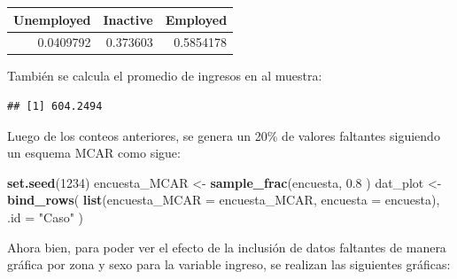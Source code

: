 \documentclass[
  spanish,
  12pt,
]{book}
\newenvironment{Shaded}{\begin{snugshade}}{\end{snugshade}}
\newcommand{\AttributeTok}[1]{\textcolor[rgb]{0.13,0.29,0.53}{#1}}
\newcommand{\ConstantTok}[1]{\textcolor[rgb]{0.56,0.35,0.01}{#1}}
\newcommand{\DecValTok}[1]{\textcolor[rgb]{0.00,0.00,0.81}{#1}}
\newcommand{\FloatTok}[1]{\textcolor[rgb]{0.00,0.00,0.81}{#1}}
\newcommand{\FunctionTok}[1]{\textcolor[rgb]{0.13,0.29,0.53}{\textbf{#1}}}
\newcommand{\NormalTok}[1]{#1}
\newcommand{\OtherTok}[1]{\textcolor[rgb]{0.56,0.35,0.01}{#1}}
\newcommand{\SpecialCharTok}[1]{\textcolor[rgb]{0.81,0.36,0.00}{\textbf{#1}}}
\newcommand{\StringTok}[1]{\textcolor[rgb]{0.31,0.60,0.02}{#1}}
\begin{document}
\begin{tabular}{r|r|r}
\hline
Unemployed & Inactive & Employed\\
\hline
0.0409792 & 0.373603 & 0.5854178\\
\hline
\end{tabular}

También se calcula el promedio de ingresos en al muestra:

\begin{Shaded}
\end{Shaded}

\begin{verbatim}
## [1] 604.2494
\end{verbatim}

Luego de los conteos anteriores, se genera un 20\% de valores faltantes siguiendo un esquema MCAR como sigue:

\begin{Shaded}
\begin{Highlighting}[]
\FunctionTok{set.seed}\NormalTok{(}\DecValTok{1234}\NormalTok{)}
\NormalTok{encuesta\_MCAR }\OtherTok{\textless{}{-}}  \FunctionTok{sample\_frac}\NormalTok{(encuesta, }\FloatTok{0.8}\NormalTok{ )}
\NormalTok{dat\_plot }\OtherTok{\textless{}{-}}       \FunctionTok{bind\_rows}\NormalTok{(}
  \FunctionTok{list}\NormalTok{(}\AttributeTok{encuesta\_MCAR =}\NormalTok{ encuesta\_MCAR, }
       \AttributeTok{encuesta =}\NormalTok{ encuesta), }\AttributeTok{.id =} \StringTok{"Caso"}\NormalTok{  )}
\end{Highlighting}
\end{Shaded}

Ahora bien, para poder ver el efecto de la inclusión de datos faltantes de manera gráfica por zona y sexo para la variable ingreso, se realizan las siguientes gráficas:
\end{document}
